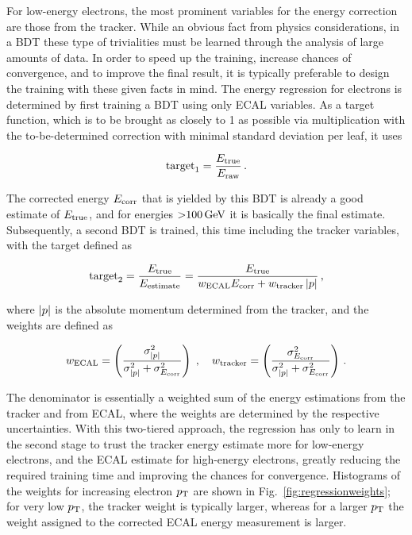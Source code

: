 For low-energy electrons, the most prominent variables for the energy correction are those from the tracker.
% 
While an obvious fact from physics considerations, in a BDT these type of trivialities must be learned through the analysis of large amounts of data.
% 
In order to speed up the training, increase chances of convergence, and to improve the final result, it is typically preferable to design the training with these given facts in mind.
% 
The energy regression for electrons is determined by first training a BDT using only ECAL variables.
%
As a target function, which is to be brought as closely to 1 as possible via multiplication with the to-be-determined correction with minimal standard deviation per leaf, it uses
% 
\begin{linenomath*}
\begin{equation}
\text{target}_1 = \frac{E_\text{true}}{E_\text{raw}}
\,.
\end{equation}
\end{linenomath*}
% 
The corrected energy $E_\text{corr}$ that is yielded by this BDT is already a good estimate of $E_\text{true}$, and for energies ${>}100\,\text{GeV}$ it is basically the final estimate.
% 
Subsequently, a second BDT is trained, this time including the tracker variables, with the target defined as
% 
\begin{linenomath*}
\begin{equation}
\text{target}_2 = 
% 
\frac{\Etrue}{E_\text{estimate}} =
% 
\frac{\Etrue}{ w_\text{ECAL} \Ecorr + w_\text{tracker} \abs{p} }
\,,
\end{equation}
\end{linenomath*}
% 
where $\left| p \right |$ is the absolute momentum determined from the tracker, and the weights are defined as
% 
\begin{linenomath*}
\begin{equation}
w_\text{ECAL} = \left( \frac{\sigma^2_{\left| p \right |}}{\sigma^2_{\left| p \right |} + \sigma^2_{E_\text{corr}}} \right)
\;,\quad
w_\text{tracker} = \left( \frac{\sigma^2_{E_\text{corr}}}{\sigma^2_{\left| p \right |} + \sigma^2_{E_\text{corr}}} \right)
\,.
\end{equation}
\end{linenomath*}
% 
The denominator is essentially a weighted sum of the energy estimations from the tracker and from ECAL, where the weights are determined by the respective uncertainties.
% 
With this two-tiered approach, the regression has only to learn in the second stage to trust the tracker energy estimate more for low-energy electrons, and the ECAL estimate for high-energy electrons, greatly reducing the required training time and improving the chances for convergence.
% 
Histograms of the weights for increasing electron $p_\mathrm{T}$ are shown in Fig.~\ref{fig:regressionweights}; for very low $p_\mathrm{T}$, the tracker weight is typically larger, whereas for a larger $p_\mathrm{T}$ the weight assigned to the corrected ECAL energy measurement is larger.


